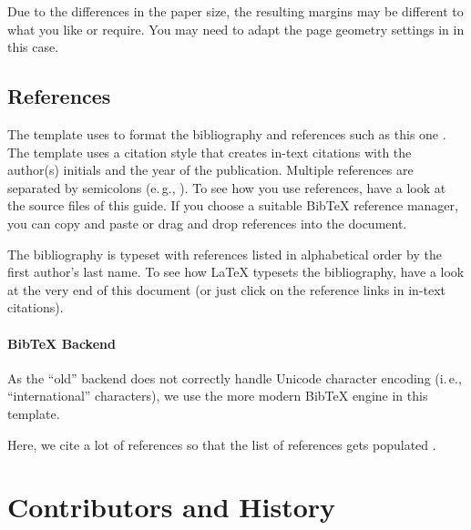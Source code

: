 Due to the differences in the paper size, the resulting margins may be different to what you like or require. You may need to adapt the page geometry settings in  in this case.

\subsection{References}

The template uses  to format the bibliography and references such as this one \cite{murdoch_steven_j._chip_2010}. The template uses a citation style that creates in-text citations with the author(s) initials and the year of the publication. Multiple references are separated by semicolons (e.\,g., \cite{solat_security_2017, bond_chip_2014}). To see how you use references, have a look at the source files of this guide. If you choose a suitable BibTeX reference manager, you can copy and paste or drag and drop references into the document.

The bibliography is typeset with references listed in alphabetical order by the first author's last name. To see how LaTeX typesets the bibliography, have a look at the very end of this document (or just click on the reference links in in-text citations).

\paragraph{BibTeX Backend}

As the ``old''  backend does not correctly handle Unicode character encoding (i.\,e., ``international'' characters), we use the more modern  BibTeX engine in this template.

Here, we cite a lot of references so that the list of references gets populated \cite{murdoch_steven_j._chip_2010,anderson_ross_emv:_2014,kou_weidong_secure_2003,solat_security_2017,bond_chip_2014,ortiz_s._is_2006,haselsteiner_security_2006,galloway_visa_2019,zhou_nshield_2014,lalehTaxonomyFraudsFraud2009,ferradiWhenOrganizedCrime2016,Yang10,Kopsell06,VilaGM03,Herrmann12-ipv6prefix,Herrmann14-diss,HBF:2013,Herrmann11-NordSec,AcarEEJND14,Herrmann09,WangG13,Raymond00,Hintz02,Herrmann14-encdns,Goodson12-privacy,WendolskyHF07,chaum81,BertholdFK00,Dingledine04,rfc5246,LoesingMD10,FuchsHF13}.



\section{Contributors and History}

